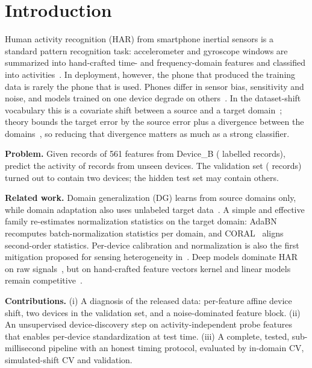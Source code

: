 \section{Introduction}
Human activity recognition (HAR) from smartphone inertial sensors is a standard pattern
recognition task: accelerometer and gyroscope windows are summarized into hand-crafted
time- and frequency-domain features and classified into activities~\cite{anguita2013}. In
deployment, however, the phone that produced the training data is rarely the phone that is
used. Phones differ in sensor bias, sensitivity and noise, and models trained on one device
degrade on others~\cite{stisen2015}. In the dataset-shift vocabulary this is a covariate
shift between a source and a target domain~\cite{quinonero2009,moreno2012}; theory bounds
the target error by the source error plus a divergence between the domains~\cite{bendavid2010},
so reducing that divergence matters as much as a strong classifier.

\textbf{Problem.} Given records of 561 features from Device\_B (\NTrain{} labelled records),
predict the activity of records from unseen devices. The validation set (\NVal{} records)
turned out to contain two devices; the hidden test set may contain others.

\textbf{Related work.} Domain generalization (DG) learns from source domains only, while
domain adaptation also uses unlabeled target data~\cite{zhou2022dg,wang2022dg}. A simple and
effective family re-estimates normalization statistics on the target domain:
AdaBN~\cite{li2017adabn} recomputes batch-normalization statistics per domain, and
CORAL~\cite{sun2016coral} aligns second-order statistics. Per-device calibration and
normalization is also the first mitigation proposed for sensing heterogeneity
in~\cite{stisen2015}. Deep models dominate HAR on raw signals~\cite{wang2019deep}, but on
hand-crafted feature vectors kernel and linear models remain competitive~\cite{anguita2013}.

\textbf{Contributions.} (i) A diagnosis of the released data: per-feature affine device shift,
two devices in the validation set, and a noise-dominated feature block. (ii) An unsupervised
device-discovery step on activity-independent probe features that enables per-device
standardization at test time. (iii) A complete, tested, sub-millisecond pipeline with an
honest timing protocol, evaluated by in-domain CV, simulated-shift CV and validation.

